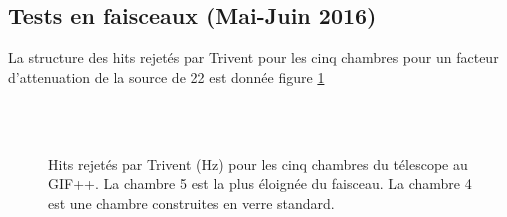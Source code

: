 \subsection{Tests en faisceaux (Mai-Juin 2016)}
La structure des hits rejetés par Trivent pour les cinq chambres pour un facteur d'attenuation de la source de \num{22} est donnée figure \ref{struc}
\begin{figure}[ht!]
	\centering
	\hfill
	\\
	\hfill
	\\
	\caption{Hits rejetés par Trivent (\si{\hertz}) pour les cinq chambres du télescope au GIF++. La chambre \num{5} est la plus éloignée du faisceau. La chambre \num{4} est une chambre construites en verre standard.}
	\label{struc}
\end{figure}

